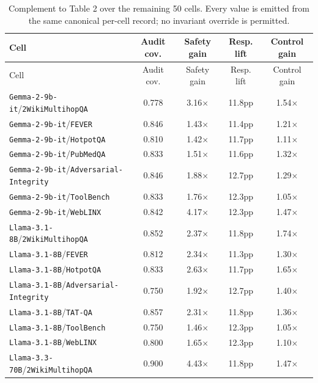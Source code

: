 
\begin{longtable}{lcccc}
\caption{\footnotesize Complement to Table 2 over the remaining 50 cells. Every value is emitted from the same canonical per-cell record; no invariant override is permitted.}\label{tab:appendix_remaining_50_r1r4_old}\\
\toprule
Cell & Audit cov. & Safety gain & Resp. lift & Control gain \\
\midrule
\endfirsthead
\toprule
Cell & Audit cov. & Safety gain & Resp. lift & Control gain \\
\midrule
\endhead
\texttt{Gemma-2-9b-it}/\texttt{2WikiMultihopQA} & 0.778 & 3.16$\times$ & 11.8pp & 1.54$\times$ \\
\texttt{Gemma-2-9b-it}/\texttt{FEVER} & 0.846 & 1.43$\times$ & 11.4pp & 1.21$\times$ \\
\texttt{Gemma-2-9b-it}/\texttt{HotpotQA} & 0.810 & 1.42$\times$ & 11.7pp & 1.11$\times$ \\
\texttt{Gemma-2-9b-it}/\texttt{PubMedQA} & 0.833 & 1.51$\times$ & 11.6pp & 1.32$\times$ \\
\texttt{Gemma-2-9b-it}/\texttt{Adversarial-Integrity} & 0.846 & 1.88$\times$ & 12.7pp & 1.29$\times$ \\
\texttt{Gemma-2-9b-it}/\texttt{ToolBench} & 0.833 & 1.76$\times$ & 12.3pp & 1.05$\times$ \\
\texttt{Gemma-2-9b-it}/\texttt{WebLINX} & 0.842 & 4.17$\times$ & 12.3pp & 1.47$\times$ \\
\texttt{Llama-3.1-8B}/\texttt{2WikiMultihopQA} & 0.852 & 2.37$\times$ & 11.8pp & 1.74$\times$ \\
\texttt{Llama-3.1-8B}/\texttt{FEVER} & 0.812 & 2.34$\times$ & 11.3pp & 1.30$\times$ \\
\texttt{Llama-3.1-8B}/\texttt{HotpotQA} & 0.833 & 2.63$\times$ & 11.7pp & 1.65$\times$ \\
\texttt{Llama-3.1-8B}/\texttt{Adversarial-Integrity} & 0.750 & 1.92$\times$ & 12.7pp & 1.40$\times$ \\
\texttt{Llama-3.1-8B}/\texttt{TAT-QA} & 0.857 & 2.31$\times$ & 11.8pp & 1.36$\times$ \\
\texttt{Llama-3.1-8B}/\texttt{ToolBench} & 0.750 & 1.46$\times$ & 12.3pp & 1.05$\times$ \\
\texttt{Llama-3.1-8B}/\texttt{WebLINX} & 0.800 & 1.65$\times$ & 12.3pp & 1.10$\times$ \\
\texttt{Llama-3.3-70B}/\texttt{2WikiMultihopQA} & 0.900 & 4.43$\times$ & 11.8pp & 1.47$\times$ \\

\end{longtable}
